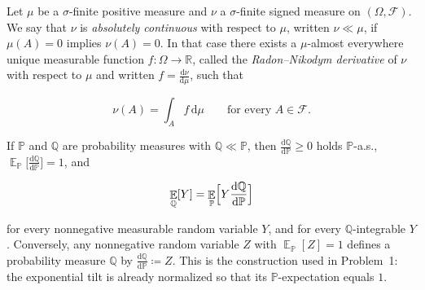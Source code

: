 \documentclass[11pt,a4paper]{article}
\DeclareMathOperator{\E}{\mathbb{E}}
\begin{document}
\begin{definition}
\label{def:radon-nikodym}
Let \(\mu\) be a \(\sigma\)-finite positive measure and \(\nu\) a \(\sigma\)-finite signed measure on \((\Omega, \mathcal{F})\). We say that \(\nu\) is \emph{absolutely continuous} with respect to \(\mu\), written \(\nu \ll \mu\), if \(\mu(A) = 0\) implies \(\nu(A) = 0\). In that case there exists a \(\mu\)-almost everywhere unique measurable function \(f \colon \Omega \to \mathbb{R}\), called the \emph{Radon--Nikodym derivative} of \(\nu\) with respect to \(\mu\) and written \(f = \frac{\mathrm{d}\nu}{\mathrm{d}\mu}\), such that

\[
\nu(A)
=
\int_{A} f\,\mathrm{d}\mu
\qquad
\text{for every } A \in \mathcal{F}.
\]

If \(\mathbb{P}\) and \(\mathbb{Q}\) are probability measures with \(\mathbb{Q} \ll \mathbb{P}\), then \(\frac{\mathrm{d}\mathbb{Q}}{\mathrm{d}\mathbb{P}} \ge 0\) holds \(\mathbb{P}\)-a.s., \(\E_{\mathbb{P}}\bigl[\frac{\mathrm{d}\mathbb{Q}}{\mathrm{d}\mathbb{P}}\bigr] = 1\), and

\[
\E_{\mathbb{Q}}[Y]
=
\E_{\mathbb{P}}\Bigl[Y \frac{\mathrm{d}\mathbb{Q}}{\mathrm{d}\mathbb{P}}\Bigr]
\]

for every nonnegative measurable random variable \(Y\), and for every \(\mathbb{Q}\)-integrable \(Y\). Conversely, any nonnegative random variable \(Z\) with \(\E_{\mathbb{P}}[Z] = 1\) defines a probability measure \(\mathbb{Q}\) by \(\frac{\mathrm{d}\mathbb{Q}}{\mathrm{d}\mathbb{P}} \coloneqq Z\). This is the construction used in Problem~1: the exponential tilt is already normalized so that its \(\mathbb{P}\)-expectation equals \(1\).
\end{definition}
\end{document}
